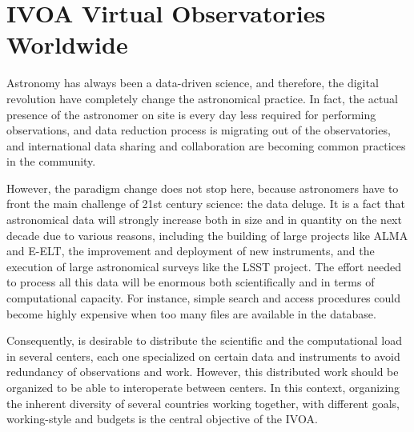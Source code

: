 \section{IVOA Virtual Observatories Worldwide}

Astronomy has always been a data-driven science, and therefore,
the digital revolution have completely change the astronomical practice.
In fact, the actual presence of the astronomer on site is every
day less required for performing observations, and data reduction process
is migrating out of the observatories, and international data sharing
and collaboration are becoming common practices in the community.

However, the paradigm change 
does not stop here, because astronomers have to front the main challenge of
21st century science: the data deluge. It is a fact that astronomical data will
strongly increase both in size and in quantity on the next decade due to various
reasons, including the building of large projects like ALMA and E-ELT, 
the improvement and deployment of new instruments, and the execution of 
large astronomical surveys like the LSST project.
The effort needed to process all this data will be enormous both
scientifically and in terms of computational capacity. 
For instance, simple search and access procedures could become highly expensive
when too many files are available in the database.

Consequently, is desirable to distribute the scientific and the computational 
load in several centers, each one specialized on certain data and instruments
to avoid redundancy of observations and work. However, this distributed work
should be organized to be able to interoperate between centers.
In this context, organizing the inherent diversity of several countries working together, 
with different goals, working-style and budgets is the central objective of
the IVOA.


